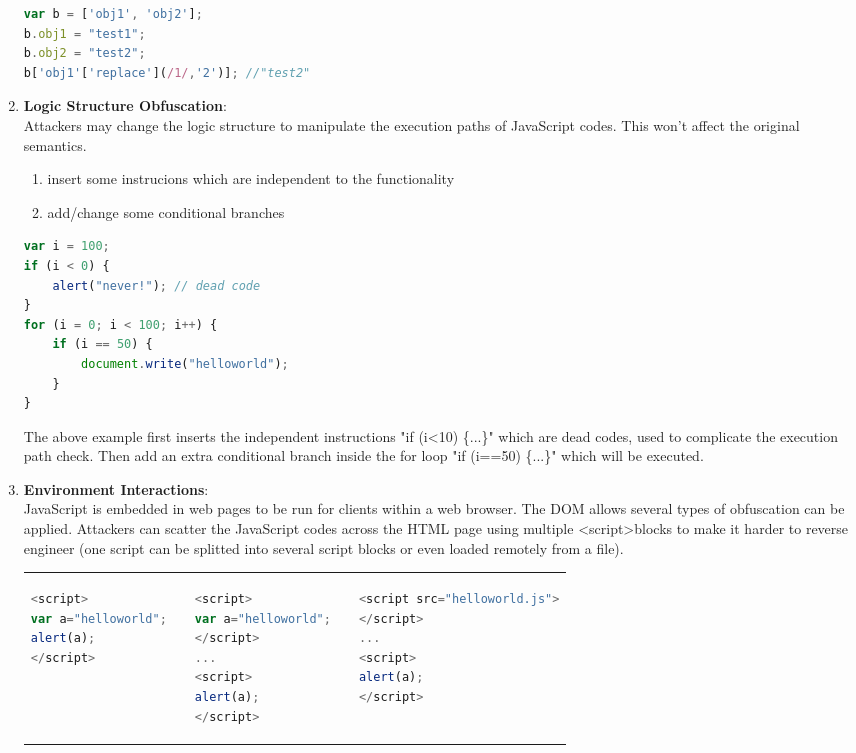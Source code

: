 \begin{enumerate}
\begin{lstlisting}[language=JavaScript, title=(obfuscated field reference example)]
var b = ['obj1', 'obj2'];
b.obj1 = "test1";
b.obj2 = "test2";
b['obj1'['replace'](/1/,'2')]; //"test2"
			\end{lstlisting}
	\newpage
	\item \textbf{Logic Structure Obfuscation}\cite{PowerOfObfuscationTechniquesInMaliciousJavaScriptCode}:\\
	Attackers may change the logic structure to manipulate the execution paths of JavaScript codes. This won't affect the original semantics. 
	\begin{enumerate}
			\item insert some instrucions which are independent to the functionality
			\item add/change some conditional branches
	\end{enumerate}
	
	\begin{lstlisting}[language=JavaScript, title=(logic structure obfuscation example)]
var i = 100;
if (i < 0) {
    alert("never!"); // dead code
}
for (i = 0; i < 100; i++) {
    if (i == 50) {
        document.write("helloworld");
    }
}
\end{lstlisting}
	The above example first inserts the independent instructions "if (i\textless 10) \{...\}" which are dead codes, used to complicate the execution path check. Then add an extra conditional branch inside the for loop "if (i==50) \{...\}" which will be executed.
	\item \textbf{Environment Interactions}\cite{Nofus}: \\
	JavaScript is embedded in web pages to be run for clients within a web browser. The DOM allows several types of obfuscation can be applied. Attackers can scatter the JavaScript codes across the HTML page using multiple \textless script\textgreater blocks to make it harder to reverse engineer (one script can be splitted into several script blocks or even loaded remotely from a file).  \\
	\begin{tabular}{p{4cm}p{0.02cm}p{4cm}p{0.02cm}p{5.6cm}}
			\begin{lstlisting}[language=JavaScript,alsolanguage=HTML5,  title=(self-contained block)]
<script>
var a="helloworld";
alert(a);
</script>
			\end{lstlisting} & & \begin{lstlisting}[language=JavaScript,alsolanguage=HTML5, title=(multiple script blocks) ]
<script>
var a="helloworld";
</script>
...
<script>
alert(a);
</script>
			\end{lstlisting}  & & \begin{lstlisting}[language=JavaScript,alsolanguage=HTML5,  title=(remote source file)]
<script src="helloworld.js">
</script>
...
<script>
alert(a);
</script>


\end{lstlisting}
\end{tabular}
\end{enumerate}
